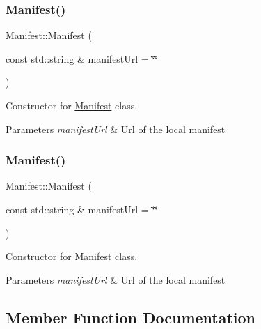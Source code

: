 \subsubsection{\texorpdfstring{Manifest()}{Manifest()}\hspace{0.1cm}{\footnotesize\ttfamily [1/2]}}
{\footnotesize\ttfamily Manifest\+::\+Manifest (\begin{DoxyParamCaption}\item[{const std\+::string \&}]{manifest\+Url = {\ttfamily \char`\"{}\char`\"{}} }\end{DoxyParamCaption})\hspace{0.3cm}{\ttfamily [protected]}}



Constructor for \hyperlink{classManifest}{Manifest} class. 


\begin{DoxyParams}{Parameters}
{\em manifest\+Url} & Url of the local manifest \\
\hline
\end{DoxyParams}
\mbox{\label{classManifest_ab824b9e77f3381d19a7f32db41840da7}} 
\subsubsection{\texorpdfstring{Manifest()}{Manifest()}\hspace{0.1cm}{\footnotesize\ttfamily [2/2]}}
{\footnotesize\ttfamily Manifest\+::\+Manifest (\begin{DoxyParamCaption}\item[{const std\+::string \&}]{manifest\+Url = {\ttfamily \char`\"{}\char`\"{}} }\end{DoxyParamCaption})\hspace{0.3cm}{\ttfamily [protected]}}



Constructor for \hyperlink{classManifest}{Manifest} class. 


\begin{DoxyParams}{Parameters}
{\em manifest\+Url} & Url of the local manifest \\
\hline
\end{DoxyParams}


\subsection{Member Function Documentation}
\mbox{\label{classManifest_a2c495778109f2ecfd8449e061f696f0c}} 

